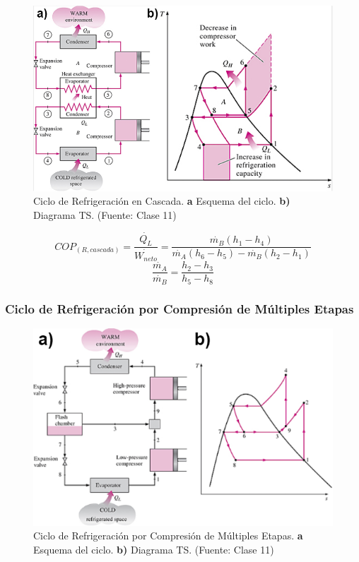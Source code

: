         \begin{figure}
            \includegraphics[width=.8\textwidth]{img/clases/ciclo_ref_cascada.png}
            \caption[Ciclo de Refrigeración en Cascada]{Ciclo de Refrigeración en Cascada. \textbf{a} Esquema del ciclo. \textbf{b)} Diagrama TS. (Fuente: Clase 11)}
            \label{fig:ciclo_ref_cascada}
        \end{figure}
        
        \[{COP}_{(R, cascada)}=\frac{\dot{Q_{L}}}{\dot{W_{neto}}}=\frac{\dot{m_{B}}(h_{1}-h_{4})}{\dot{m_{A}}(h_{6}-h_{5})-\dot{m_{B}}(h_{2}-h_{1})}\]
        \[\frac{\dot{m_{A}}}{\dot{m_{B}}}=\frac{h_{2}-h_{3}}{h_{5}-h_{8}}\]
        
        \subsubsection{Ciclo de Refrigeración por Compresión de Múltiples Etapas}
        
        \begin{figure}
            \includegraphics[width=.65\textwidth]{img/clases/ciclo_ref_mul_etapas.png}
            \caption[Ciclo de Refrigeración por Compresión de Múltiples Etapas]{Ciclo de Refrigeración por Compresión de Múltiples Etapas. \textbf{a} Esquema del ciclo. \textbf{b)} Diagrama TS. (Fuente: Clase 11)}
            \label{fig:ciclo_ref_mul_etapas}
        \end{figure}
        
